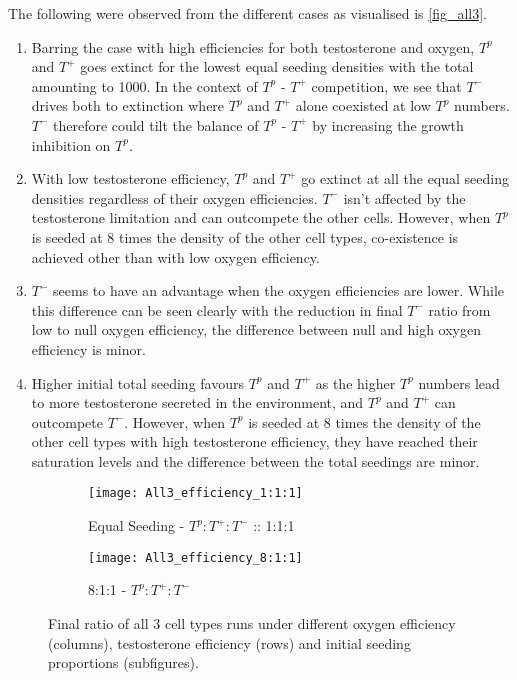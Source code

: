 The following were observed from the different cases as visualised is \autoref{fig_all3}.
\begin{enumerate}
  \item Barring the case with high efficiencies for both testosterone and oxygen, $T^p$ and $T^+$ goes extinct for the lowest equal seeding densities with the total amounting to 1000. In the context of $T^p$ - $T^+$ competition, we see that $T^-$ drives both to extinction where $T^p$ and $T^+$ alone coexisted at low $T^p$ numbers. $T^-$ therefore could tilt the balance of $T^p$ - $T^+$ by increasing the growth inhibition on $T^p$.
  \item With low testosterone efficiency, $T^p$ and $T^+$ go extinct at all the equal seeding densities regardless of their oxygen efficiencies. $T^-$ isn't affected by the testosterone limitation and can outcompete the other cells. However, when $T^p$ is seeded at 8 times the density of the other cell types, co-existence is achieved  other than with low oxygen efficiency.
  \item $T^-$ seems to have an advantage when the oxygen efficiencies are lower. While this difference can be seen clearly with the reduction in final $T^-$ ratio from low to null oxygen efficiency, the difference between null and high oxygen efficiency is minor.
  \item Higher initial total seeding favours $T^p$ and $T^+$ as the higher $T^p$ numbers lead to more testosterone secreted in the environment, and $T^p$ and $T^+$ can outcompete $T^-$. However, when $T^p$ is seeded at 8 times the density of the other cell types with high testosterone efficiency, they have reached their saturation levels and the difference between the total seedings are minor.
\end{enumerate}

\begin{figure}[h!]
  \centering
  \begin{subfigure}[b]{\textwidth}
    \centering
    \texttt{[image: All3\_efficiency\_1:1:1]}
    \caption{Equal Seeding - $T^p:T^+:T^-$ :: 1:1:1 }
    \label{fig_all3_1:1:1}
  \end{subfigure}
  \begin{subfigure}[b]{\textwidth}
    \centering
    \texttt{[image: All3\_efficiency\_8:1:1]}
    \caption{8:1:1 - $T^p:T^+:T^-$}
    \label{fig_all3_8:1:1}
  \end{subfigure}
  \caption[Final ratio of all 3 cell types runs under different efficiencies]{Final ratio of all 3 cell types runs under different oxygen efficiency (columns), testosterone efficiency (rows) and initial seeding proportions (subfigures).}
  \label{fig_all3}
\end{figure}
